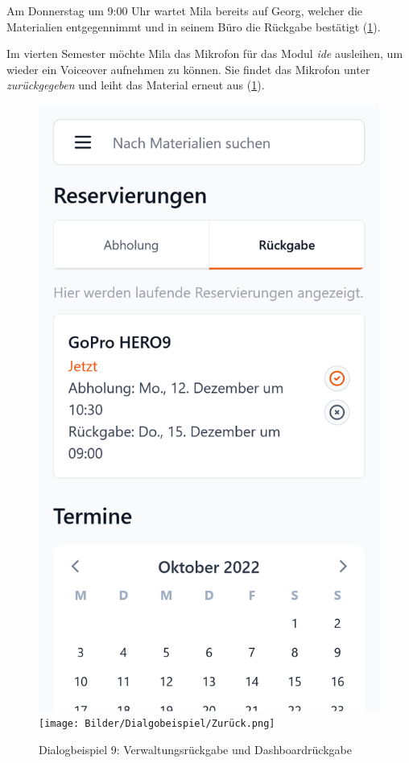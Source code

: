 Am Donnerstag um 9:00 Uhr wartet Mila bereits auf Georg, welcher die
Materialien entgegennimmt und in seinem Büro die Rückgabe bestätigt (\ref{fig:zuruck}).

Im vierten Semester möchte Mila das Mikrofon für das Modul \textit{\ac{ide}}
ausleihen, um wieder ein Voiceover aufnehmen zu können. Sie findet das Mikrofon
unter \textit{zurückgegeben} und leiht das Material erneut aus (\ref{fig:zuruck}).
\begin{figure}[h]
    \centering
    \includegraphics[scale=0.2]{Bilder/Dialgobeispiel/Altes Datum.png}
    \texttt{[image: Bilder/Dialgobeispiel/Zurück.png]}
    \caption{Dialogbeispiel 9: Verwaltungsrückgabe und Dashboardrückgabe}\label{fig:zuruck}
\end{figure}